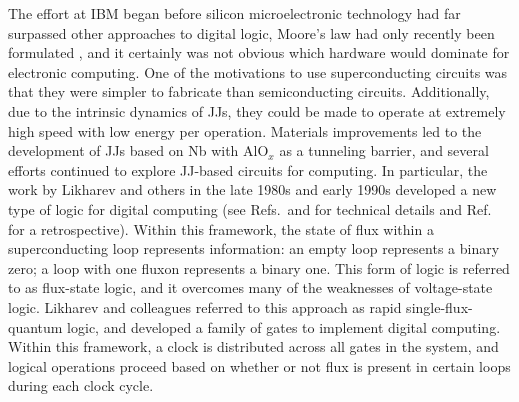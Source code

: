 \documentclass[twocolumn]{article}
\begin{document}
The effort at IBM began before silicon microelectronic technology had far surpassed other approaches to digital logic, Moore's law had only recently been formulated \cite{mo1965}, and it certainly was not obvious which hardware would dominate for electronic computing. One of the motivations to use superconducting circuits was that they were simpler to fabricate than semiconducting circuits. Additionally, due to the intrinsic dynamics of JJs, they could be made to operate at extremely high speed with low energy per operation. Materials improvements led to the development of JJs based on Nb with AlO$_{x}$ as a tunneling barrier, and several efforts continued to explore JJ-based circuits for computing. In particular, the work by Likharev and others in the late 1980s and early 1990s developed a new type of logic for digital computing (see Refs.\,\cite{lise1991} and \cite{buli2001} for technical details and Ref.\,\cite{li2012} for a retrospective). Within this framework, the state of flux within a superconducting loop represents information: an empty loop represents a binary zero; a loop with one fluxon represents a binary one. This form of logic is referred to as flux-state logic, and it overcomes many of the weaknesses of voltage-state logic. Likharev and colleagues referred to this approach as rapid single-flux-quantum logic, and developed a family of gates to implement digital computing. Within this framework, a clock is distributed across all gates in the system, and logical operations proceed based on whether or not flux is present in certain loops during each clock cycle. 
\end{document}
